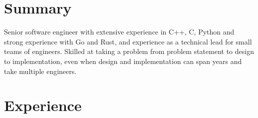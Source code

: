 \documentclass[overlapped]{res}
\begin{document}

\address{
  \href{mailto:miriam@mutexlox.com}{miriam@mutexlox.com} \\
  \hfill \href{https://www.linkedin.com/in/miriam-zimmerman-9a2507117}{www.linkedin.com/in/miriam-zimmerman-9a2507117} \\
}
\address{  %
  \hfill \href{https://mutexlox.com}{https://mutexlox.com} \\
  \hfill Boston, Massachusetts
}

\begin{resume}


\section{Summary}
  Senior software engineer with extensive experience in C++, C, Python and
  strong experience with Go and Rust, and experience as a technical lead for
  small teams of engineers. Skilled at taking a problem from problem
  statement to design to implementation, even when design and implementation
  can span years and take multiple engineers.

\section{Experience}
  \vspace{0.5ex}


\end{resume}
\end{document}
